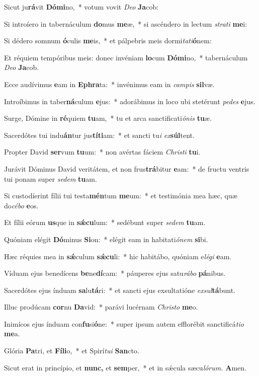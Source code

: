 \item Sicut ju\textbf{rá}vit \textbf{Dó}\textbf{mi}no,~* votum vovit \textit{Deo} \textbf{Ja}cob:
\item Si introíero in tabernáculum \textbf{do}mus \textbf{me}æ,~* si ascéndero in le\-ctum \textit{strati} \textbf{me}i:
\item Si dédero somnum \textbf{ó}culis \textbf{me}is,~* et pálpebris meis dormi\textit{tati}\textbf{ó}nem:
\item Et réquiem tempóribus meis: donec invéniam \textbf{lo}cum \textbf{Dó}\textbf{mi}no,~* tabernáculum \textit{Deo} \textbf{Ja}cob.
\item Ecce audívimus \textbf{e}am in \textbf{E}\textbf{phra}ta:~* invénimus eam in \textit{campis} \textbf{sil}væ.
\item Introíbimus in taber\textbf{ná}culum \textbf{e}jus:~* adorábimus in loco ubi stetérunt \textit{pedes} \textbf{e}jus.
\item Surge, Dómine in \textbf{ré}quiem \textbf{tu}am,~* tu et arca sanctificati\textit{ónis} \textbf{tu}æ.
\item Sacerdótes tui indu\textbf{án}tur jus\textbf{tí}\textbf{ti}am:~* et sancti tu\tinyhspace\textit{i} \textit{ex}\teenyhspace\textbf{súl}tent.
\item Propter David \textbf{ser}vum \textbf{tu}um:~* non avértas fáciem \textit{Christi} \textbf{tu}i.
\item Jurávit Dóminus David veritátem, et non frus\textbf{trá}bitur \textbf{e}am:~* de fructu ventris tui ponam super \textit{sedem} \textbf{tu}am.
\item Si custodíerint fílii tui testa\textbf{mén}tum \textbf{me}um:~* et testimónia mea hæc, quæ do\tinyhspace\textit{cébo} \textbf{e}os.
\item Et fílii eórum \textbf{us}que in \textbf{sǽ}\textbf{cu}lum:~* sedébunt super \textit{sedem} \textbf{tu}am.
\item Quóniam elégit \textbf{Dó}minus \textbf{Si}on:~* elégit eam in habitati\tinyhspace\textit{ónem} \textbf{si}bi.
\item Hæc réquies mea in \textbf{sǽ}culum \textbf{sǽ}\textbf{cu}li:~* hic habitábo, quóniam e\textit{légi} \textbf{e}am.
\item Víduam ejus benedícens \textbf{be}ne\textbf{dí}cam:~* páuperes ejus satu\tinyhspace\textit{rábo} \textbf{pá}nibus.
\item Sacerdótes ejus índuam \textbf{sa}lu\textbf{tá}ri:~* et sancti ejus exsultatióne \textit{exsul}\textbf{tá}bunt.
\item Illuc prodúcam \textbf{cor}nu \textbf{Da}vid:~* parávi lucérnam \textit{Christo} \textbf{me}o.
\item Inimícos ejus índuam con\textbf{fu}si\textbf{ó}ne:~* super i\-psum autem efflorébit sanctificá\tinyhspace\textit{tio} \textbf{me}a.
\item Glória \textbf{Pa}tri, et \textbf{Fí}\textbf{li}o,~* et Spirí\tinyhspace\textit{tui} \textbf{San}cto.
\item Sicut erat in princípio, et \textbf{nunc,} et \textbf{sem}per,~* et in sǽcula sæcu\tinyhspace\textit{lórum.} \textbf{A}men.
